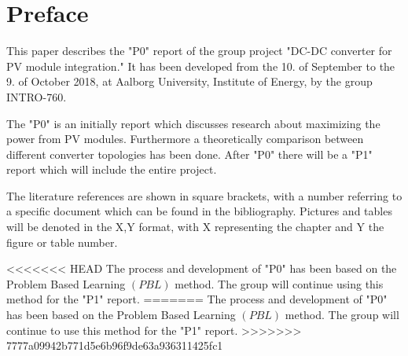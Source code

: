 \chapter*{Preface}

This paper describes the "P0" report of the group project "DC-DC converter for PV module integration." It has been developed from the 10. of September to the 9. of October 2018, at Aalborg University, Institute of Energy, by the group INTRO-760.

The "P0" is an initially report which discusses research about maximizing the power from PV modules.
Furthermore a theoretically comparison between different converter topologies has been done. After "P0" there will be a "P1" report which will include the entire project.

The literature references are shown in square brackets, with a number referring to a specific document which can be found in the bibliography. Pictures and tables will be denoted in the X,Y format, with X representing the chapter and Y the figure or table number. 

<<<<<<< HEAD
The process and development of "P0" has been based on the Problem Based Learning $(PBL)$ method. The group will continue using this method for the "P1" report.           
=======
The process and development of "P0" has been based on the Problem Based Learning $(PBL)$ method. The group will continue to use this method for the "P1" report.            
>>>>>>> 7777a09942b771d5e6b96f9de63a936311425fc1

